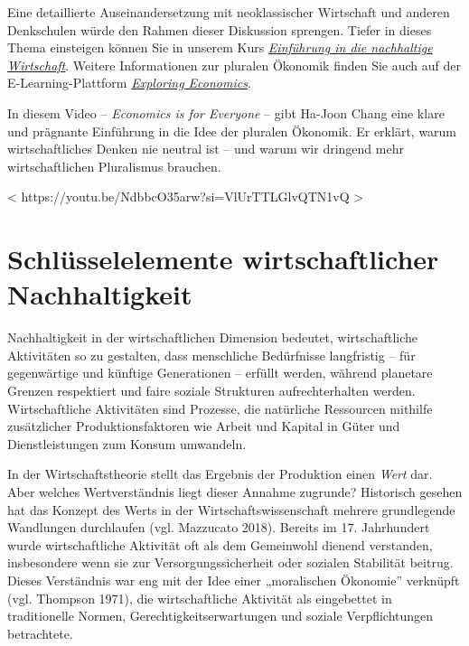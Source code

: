\documentclass[
  nswissgerman,
  a4paper,
  DIV=11,
  numbers=noendperiod,
  oneside,
  openany]{scrreprt}
\begin{document}
\begin{tcolorbox}
Eine detaillierte Auseinandersetzung mit neoklassischer Wirtschaft und
anderen Denkschulen würde den Rahmen dieser Diskussion sprengen. Tiefer
in dieses Thema einsteigen können Sie in unserem Kurs
\href{https://cdeteaching.github.io/SP_SustainableEconomics/}{\emph{Einführung
in die nachhaltige Wirtschaft}}. Weitere Informationen zur pluralen
Ökonomik finden Sie auch auf der E-Learning-Plattform
\href{https://www.exploring-economics.org/en/}{\emph{Exploring
Economics}}.

In diesem Video -- \emph{Economics is for Everyone} -- gibt Ha-Joon
Chang eine klare und prägnante Einführung in die Idee der pluralen
Ökonomik. Er erklärt, warum wirtschaftliches Denken nie neutral ist --
und warum wir dringend mehr wirtschaftlichen Pluralismus brauchen.

{{< https://youtu.be/NdbbcO35arw?si=VlUrTTLGlvQTN1vQ >}}

\end{tcolorbox}

\section{Schlüsselelemente wirtschaftlicher
Nachhaltigkeit}\label{schluxfcsselelemente-wirtschaftlicher-nachhaltigkeit}

Nachhaltigkeit in der wirtschaftlichen Dimension bedeutet,
wirtschaftliche Aktivitäten so zu gestalten, dass menschliche
Bedürfnisse langfristig -- für gegenwärtige und künftige Generationen --
erfüllt werden, während planetare Grenzen respektiert und faire soziale
Strukturen aufrechterhalten werden. Wirtschaftliche Aktivitäten sind
Prozesse, die natürliche Ressourcen mithilfe zusätzlicher
Produktionsfaktoren wie Arbeit und Kapital in Güter und Dienstleistungen
zum Konsum umwandeln.

In der Wirtschaftstheorie stellt das Ergebnis der Produktion einen
\emph{Wert} dar. Aber welches Wertverständnis liegt dieser Annahme
zugrunde? Historisch gesehen hat das Konzept des Werts in der
Wirtschaftswissenschaft mehrere grundlegende Wandlungen durchlaufen
(vgl. Mazzucato 2018). Bereits im 17. Jahrhundert wurde wirtschaftliche
Aktivität oft als dem Gemeinwohl dienend verstanden, insbesondere wenn
sie zur Versorgungssicherheit oder sozialen Stabilität beitrug. Dieses
Verständnis war eng mit der Idee einer „moralischen Ökonomie'' verknüpft
(vgl. Thompson 1971), die wirtschaftliche Aktivität als eingebettet in
traditionelle Normen, Gerechtigkeitserwartungen und soziale
Verpflichtungen betrachtete.
\end{document}
